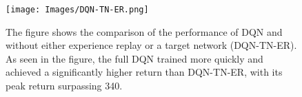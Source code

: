 \documentclass{article}
\begin{document}
\begin{figure}[htbp]
\centering
\texttt{[image: Images/DQN-TN-ER.png]}
\caption{\label{fig:Comparison of DQN and DQN-TN-ER}The figure shows the comparison of the performance of DQN and without either experience replay or a target network (DQN-TN-ER). As seen in the figure, the full DQN trained more quickly and achieved a significantly higher return than DQN-TN-ER, with its peak return surpassing 340.}
\end{figure}



\end{document}
